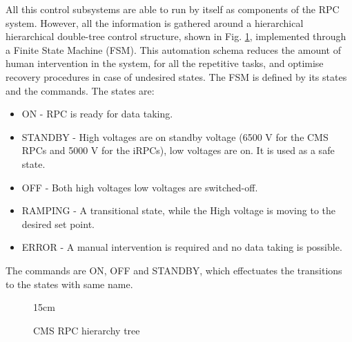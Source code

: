 All this control subsystems are able to run by itself as components of the RPC system. However, all the information is gathered around a hierarchical hierarchical double-tree control structure, shown in Fig. \ref{fig:RPC_DCS_structure}, implemented through a Finite State Machine (FSM). This automation schema reduces the amount of human intervention in the system, for all the repetitive tasks, and optimise recovery procedures in case of undesired states. The FSM is defined by its states and the commands. The states are:
\begin{itemize}
    \item ON - RPC is ready for data taking.
    \item STANDBY - High voltages are on standby voltage (6500 V for the CMS RPCs and 5000 V for the iRPCs), low voltages are on. It is used as a safe state.
    \item OFF - Both high voltages low voltages are switched-off.
    \item RAMPING - A transitional state, while the High voltage is moving to the desired set point.
    \item ERROR - A manual intervention is required and no data taking is possible.
\end{itemize}
The commands are ON, OFF and STANDBY, which effectuates the transitions to the states with same name.

\begin{figure}[!htm]{15cm} %
\caption{CMS RPC hierarchy tree}%
\label{fig:RPC_DCS_structure}
\end{figure}

